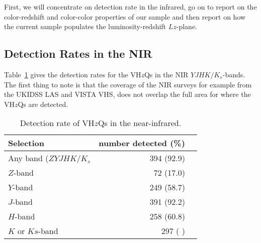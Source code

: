 \documentclass[usenatbib]{mnras}
\begin{document}
First, we will concentrate on detection rate in the infrared, go on to
report on the color-redshift and color-color properties of our sample
and then report on how the current sample populates the
luminosity-redshift $Lz$-plane.


    \subsection{Detection Rates in the NIR}
    Table~\ref{tab:nir_detection} gives the detection rates for the 
    VH$z$Qs in the NIR $YJHK/K_{s}$-bands. 
    The first thing to note is that the coverage of the NIR surveys 
    for example from the UKIDSS LAS and VISTA VHS, does
    not overlap the full area for where the VH$z$Qs are detected. 

    \begin{table}
          \centering

      \begin{tabular}{l r l}
        \hline  \hline
        Selection   & number detected (\%) \\
        \hline  
        Any band ($ZYJHK/K_{s}$   &  394  (92.9) \\
        $Z$-band    &  72  (17.0) \\
        $Y$-band    &  249  (58.7) \\
        $J$-band    &  391  (92.2) \\
        $H$-band    &  258  (60.8) \\
        $K$ or $Ks$-band    &  297  ( ) \\
        \hline  \hline
      \end{tabular}
      \caption{Detection rate of VH$z$Qs in the near-infrared.}
      \label{tab:nir_detection}
    \end{table}
\end{document}
